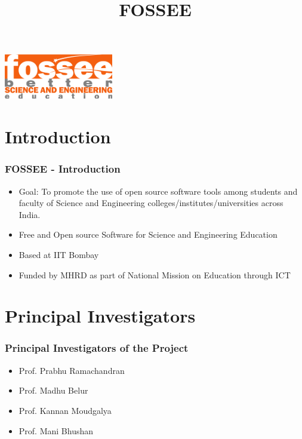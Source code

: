 \documentclass{beamer}
\title{FOSSEE}
\institute[IIT Bombay] {IIT Bombay}
\date{}
\begin{document}
\begin{frame}
   \begin{center}
   \maketitle
   \includegraphics[scale=2]{fossee.png}    
   \end{center}  
\end{frame}


\section{Introduction}
\begin{frame}
  \frametitle{{FOSSEE} - Introduction}
  \begin{itemize}
  \item Goal: To promote the use of open source software tools among students and faculty of Science and Engineering colleges/institutes/universities across India.
  \item Free and Open source Software for Science and Engineering Education 
  \item Based at IIT Bombay
  \item Funded by MHRD as part of National Mission on Education through ICT
  \end{itemize}  
\end{frame}

\section{Principal Investigators}
\begin{frame}
  \frametitle{Principal Investigators of the Project}
  \begin{itemize}
  \item Prof. Prabhu Ramachandran
  \item Prof. Madhu Belur
  \item Prof. Kannan Moudgalya
  \item Prof. Mani Bhushan
  \end{itemize}
\end{frame}
\end{document}
